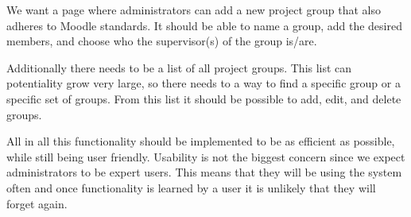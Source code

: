 We want a page where administrators can add a new project group that also adheres to Moodle standards.
It should be able to name a group, add the desired members, and choose who the supervisor(s) of the group is/are.

Additionally there needs to be a list of all project groups.
This list can potentiality grow very large, so there needs to a way to find a specific group or a specific set of groups. 
From this list it should be possible to add, edit, and delete groups. 

All in all this functionality should be implemented to be as efficient as possible, while still being user friendly.
Usability is not the biggest concern since we expect administrators to be expert users.
This means that they will be using the system often and once functionality is learned by a user it is unlikely that they will forget again.